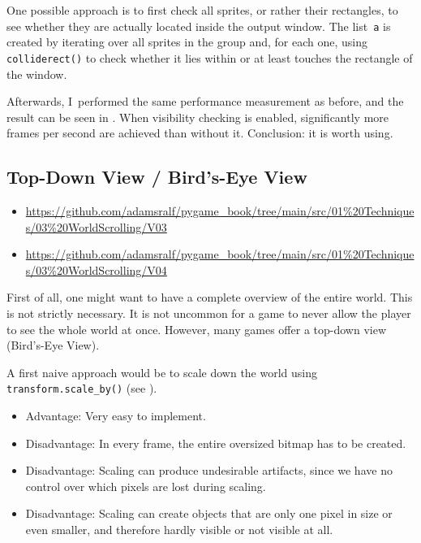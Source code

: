 One possible approach is to first check all sprites, or rather their rectangles, to see whether they are actually located inside the output window. The list~\texttt{a} is created by iterating over all sprites in the group and, for each one, using \texttt{colliderect()} to check whether it lies within or at least touches the rectangle of the window.


Afterwards, I~performed the same performance measurement as before, and the result can be seen in . When visibility checking is enabled, significantly more frames per second are achieved than without it. Conclusion: it is worth using.


\subsection{Top-Down View / Bird's-Eye View}
\begin{diskbox}
	\begin{itemize}
		\item \url{https://github.com/adamsralf/pygame_book/tree/main/src/01%20Techniques/03%20WorldScrolling/V03}
		\item \url{https://github.com/adamsralf/pygame_book/tree/main/src/01%20Techniques/03%20WorldScrolling/V04}
	\end{itemize}
\end{diskbox}
First of all, one might want to have a complete overview of the entire world. This is not strictly necessary. It is not uncommon for a game to never allow the player to see the whole world at once. However, many games offer a top-down view (Bird's-Eye View).

A first naive approach would be to scale down the world using \texttt{transform.scale\_by()} (see ). 

\begin{hintbox}
\begin{itemize}
	\item Advantage: Very easy to implement.
	\item Disadvantage: In every frame, the entire oversized bitmap has to be created.
	\item Disadvantage: Scaling can produce undesirable artifacts, since we have no control over which pixels are lost during scaling.
	\item Disadvantage: Scaling can create objects that are only one pixel in size or even smaller, and therefore hardly visible or not visible at all.
\end{itemize}
\end{hintbox}

